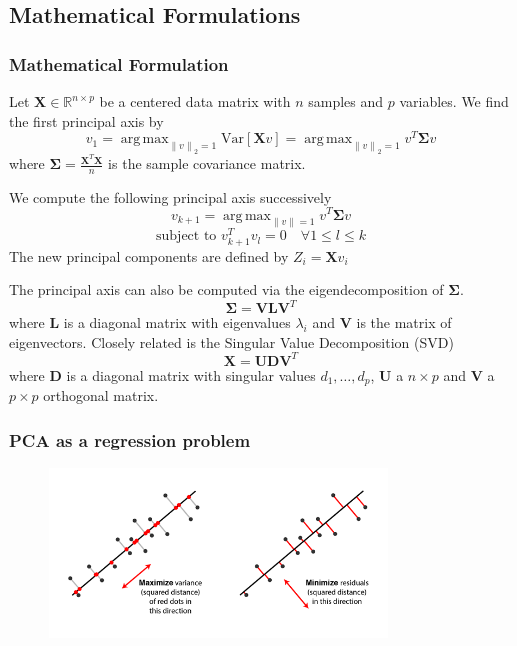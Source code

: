 \documentclass{beamer}
\theoremstyle{plain}
\theoremstyle{definition}
\newcommand{\mat}[1]{\mathbf{#1}}
\DeclareMathOperator*{\argmax}{arg\,max}
\newcommand{\norm}[1]{\left\lVert #1 \right\rVert}
\begin{document}
\subsection{Mathematical Formulations}
\begin{frame}
\frametitle{Mathematical Formulation}
Let $\mat X \in \mathbb{R}^{n \times p}$ be a centered data matrix with $n$ samples and $p$ variables. We find the first principal axis by 
$$v_1 = \argmax_{\norm{v}_2 = 1} \text{Var}[\mat{X}v] = \argmax_{\norm{v}_2 = 1} v^T \mat{\Sigma} v$$
where $\mat{\Sigma} = \frac{\mat X^T \mat X}{n}$ is the sample covariance matrix.

We compute the following principal axis successively
$$v_{k+1} = \argmax_{\norm{v} = 1} v^T \mat{\Sigma} v$$ 
$$\text{subject to }v_{k+1}^Tv_l = 0 \quad \forall 1 \leq l \leq k$$
The new principal components are defined by $Z_i = \mat{X}v_i$

\end{frame}

\begin{frame}
The principal axis can also be computed via the eigendecomposition of $\mat{\Sigma}$.
$$\mat{\Sigma} = \mat V \mat L \mat{V}^T$$
where $\mat{L}$ is a diagonal matrix with eigenvalues $\lambda_i$ and $\mat V$ is the matrix of eigenvectors.
Closely related is the Singular Value Decomposition (SVD) 
$$ \mat{X} = \mat{U}\mat{D}\mat{V}^T $$
where $\mat{D}$ is a diagonal matrix with singular values $d_1,\ldots,d_p$, $\mat{U}$ a $n \times p$ and $\mat{V}$ a $p \times p$ orthogonal matrix.
\end{frame}

\begin{frame}
\frametitle{PCA as a regression problem}
\begin{figure}
\centering
\includegraphics[width = 0.8\textwidth]{figures/pca_projection_explanation.png}
\label{pca_projection_explanation}
\end{figure}
\end{frame}
\end{document}
